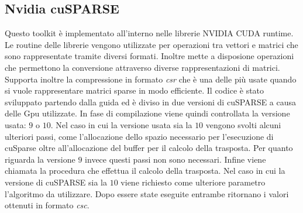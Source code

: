 \documentclass[]{IEEEtran}
\begin{document}
	\subsection{Nvidia cuSPARSE}
	Questo toolkit è implementato all'interno nelle librerie NVIDIA CUDA runtime. Le routine delle librerie vengono utilizzate per operazioni tra vettori e matrici che sono rappresentate tramite diversi formati. Inoltre mette a disposione operazioni che permettono la conversione attraverso diverse rappresentazioni di matrici. Supporta inoltre la compressione in formato \textit{csr} che è una delle più usate quando si vuole rappresentare matrici sparse in modo efficiente.\newline	
	Il codice è stato sviluppato partendo dalla guida \cite{cusparse} ed è diviso in due versioni di cuSPARSE a causa delle Gpu utilizzate. In fase di compilazione viene quindi controllata la versione usata: $ 9 $ o $ 10 $.\newline
	Nel caso in cui la versione usata sia la $ 10 $ vengono svolti alcuni ulteriori passi, come l'allocazione dello spazio necessario per l'esecuzione di cuSparse oltre all'allocazione del buffer per il calcolo della trasposta. Per quanto riguarda la versione $ 9 $ invece questi passi non sono necessari.\newline
	Infine viene chiamata la procedura che effettua il calcolo della trasposta. Nel caso in cui la versione di cuSPARSE sia la $ 10 $ viene richiesto come ulteriore parametro l'algoritmo da utilizzare.\newline
	Dopo essere state eseguite entrambe ritornano i valori ottenuti in formato \textit{csc}.
\end{document}
